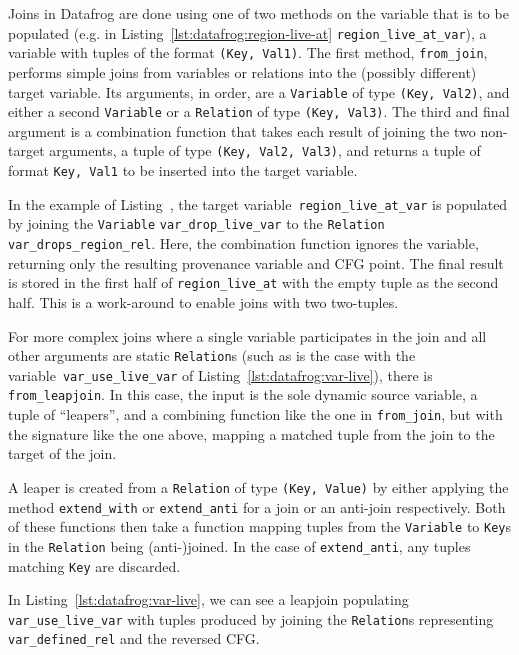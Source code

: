 \documentclass[11pt,a4paper,twoside,openany]{report}
\newcommand{\InRust}[1]{\texttt{#1}}
\begin{document}
Joins in Datafrog are done using one of two methods on the variable that is to
be populated (e.g. in Listing~\ref{lst:datafrog:region-live-at}
\InRust{region_live_at_var}), a variable with tuples of the format \InRust{(Key,
  Val1)}. The first method, \InRust{from_join}, performs simple joins from
variables or relations into the (possibly different) target variable. Its
arguments, in order, are a \InRust{Variable} of type \InRust{(Key, Val2)}, and
either a second \InRust{Variable} or a \InRust{Relation} of type \InRust{(Key,
  Val3)}. The third and final argument is a combination function that takes each
result of joining the two non-target arguments, a tuple of type \InRust{(Key,
  Val2, Val3)}, and returns a tuple of format \InRust{Key, Val1} to be inserted
into the target variable.

In the example of Listing~\label{lst:datafrog:region-live-at}, the target
variable~\InRust{region_live_at_var} is populated by joining the
\InRust{Variable} \InRust{var_drop_live_var} to the \InRust{Relation}
\InRust{var_drops_region_rel}. Here, the combination function ignores the
variable, returning only the resulting provenance variable and CFG point. The
final result is stored in the first half of \InRust{region_live_at} with the
empty tuple as the second half. This is a work-around to enable joins with two
two-tuples.

For more complex joins where a single variable participates in the join and all
other arguments are static \InRust{Relation}s (such as is the case with the
variable~\InRust{var_use_live_var} of Listing~\ref{lst:datafrog:var-live}), there is
\InRust{from_leapjoin}. In this case, the input is the sole dynamic source
variable, a tuple of ``leapers'', and a combining function like the one in
\InRust{from_join}, but with the signature like the one above, mapping a matched
tuple from the join to the target of the join.

A leaper is created from a \InRust{Relation} of type \InRust{(Key, Value)} by
either applying the method \InRust{extend_with} or \InRust{extend_anti} for a
join or an anti-join respectively. Both of these functions then take a function
mapping tuples from the \InRust{Variable} to \InRust{Key}s in the
\InRust{Relation} being (anti-)joined. In the case of \InRust{extend_anti}, any
tuples matching \InRust{Key} are discarded.

In Listing~\ref{lst:datafrog:var-live}, we can see a leapjoin populating
\InRust{var_use_live_var} with tuples produced by joining the \InRust{Relation}s
representing \InRust{var_defined_rel} and the reversed CFG.
\end{document}
